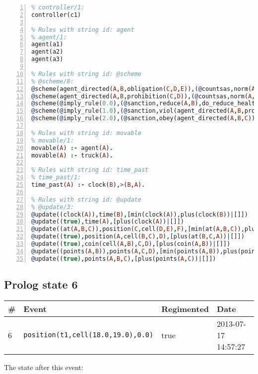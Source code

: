 \documentclass[11pt]{article}\usepackage[utf8]{inputenc}\usepackage{geometry}
\begin{document}
\begin{lstlisting}[language=Prolog, numbers=left]
% Rules with string id: controller
% controller/1:
controller(c1)

% Rules with string id: agent
% agent/1:
agent(a1)
agent(a2)
agent(a3)

% Rules with string id: @scheme
% @scheme/8:
@scheme(agent_directed(A,B,obligation(C,D,E)),(@countsas,norm(A,B,F,obligation(C,D,E)),F),false,(listTrue(C)),(time_past(D)),false,[plus(viol(agent_directed(A,B,obligation(C,D,E))))|[]],[plus(obey(agent_directed(A,B,obligation(C,D,E))))|[]])
@scheme(agent_directed(A,B,prohibition(C,D)),(@countsas,norm(A,B,E,prohibition(C,D)),E),(listTrue(C)),false,(false),false,[plus(viol(agent_directed(A,B,prohibition(C,D))))|[]],[plus(obey(agent_directed(A,B,prohibition(C,D))))|[]])
@scheme(@imply_rule(0.0),(@sanction,reduce(A,B),do_reduce_health(A,B),notifyAgent(A,changed(status))),true,false,false,false,[min(reduce(A,B))|[]],[])
@scheme(@imply_rule(1.0),(@sanction,viol(agent_directed(A,B,prohibition(C,D))),do_sanction(D)),true,false,false,false,[min(viol(agent_directed(A,B,prohibition(C,D))))|[]],[])
@scheme(@imply_rule(2.0),(@sanction,obey(agent_directed(A,B,C))),true,false,false,false,[min(obey(agent_directed(A,B,C)))|[]],[])

% Rules with string id: movable
% movable/1:
movable(A) :- agent(A).
movable(A) :- truck(A).

% Rules with string id: time_past
% time_past/1:
time_past(A) :- clock(B),>(B,A).

% Rules with string id: @update
% @update/3:
@update((clock(A)),time(B),[min(clock(A)),plus(clock(B))|[]])
@update((true),time(A),[plus(clock(A))|[]])
@update((at(A,B,C)),position(C,cell(D,E),F),[min(at(A,B,C)),plus(at(D,E,C))|[]])
@update((true),position(A,cell(B,C),D),[plus(at(B,C,A))|[]])
@update((true),coin(cell(A,B),C,D),[plus(coin(A,B))|[]])
@update((points(A,B)),points(A,C,D),[min(points(A,B)),plus(points(A,D))|[]])
@update((true),points(A,B,C),[plus(points(A,C))|[]])

\end{lstlisting}
\clearpage 
\subsection{Prolog state 6}
\begin{table}[ht]
\centering 
\begin{tabular}{l l l l} 
\textbf{\#} & \textbf{Event} & \textbf{Regimented} & \textbf{Date} \\ [0.5ex] 
\hline
6&\texttt{position(t1,cell(18.0,19.0),0.0)}&true&2013-07-17 14:57:27\\ [1ex] \hline\end{tabular}
\end{table}
The state after this event:
\end{document}
